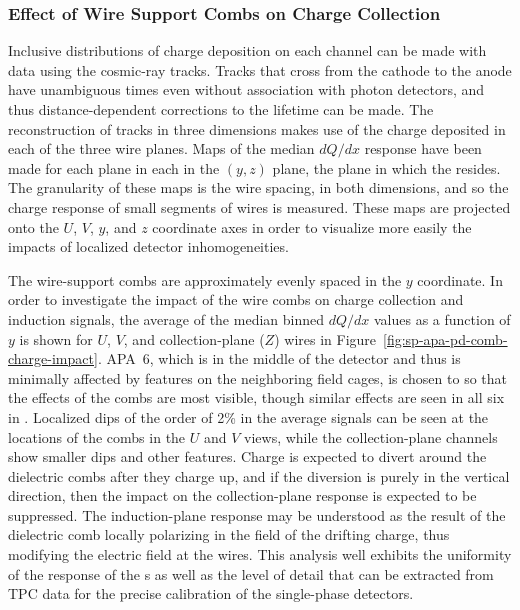 


\subsubsection{Effect of Wire Support Combs on Charge Collection}
\label{sec:fdsp-apa-qa-protodune-ops-combs-charge}

Inclusive distributions of charge deposition on each channel can be made with  data using the cosmic-ray tracks.  Tracks that cross from the cathode to the anode have unambiguous times even without association with photon detectors, and thus distance-dependent corrections to the lifetime can be made.  The reconstruction of tracks in three dimensions makes use of the charge deposited in each of the three wire planes.  Maps of the median $dQ/dx$ response have been made for each plane in each  in the $(y,z)$ plane, the plane in which the  resides.  The granularity of these maps is the wire spacing, in both dimensions, and so the charge response of small segments of wires is measured.  These maps are projected onto the $U$, $V$, $y$, and $z$ coordinate axes in order to visualize more easily the impacts of localized detector inhomogeneities.

The wire-support combs are approximately evenly spaced in the $y$ coordinate.  In order to investigate the impact of the wire combs on charge collection and induction signals, the average of the median binned $dQ/dx$ values as a function of $y$ is shown for $U$, $V$, and collection-plane ($Z$) wires in Figure~\ref{fig:sp-apa-pd-comb-charge-impact}.  APA~6, which is in the middle of the detector and thus is minimally affected by features on the neighboring field cages, is chosen to so that the effects of the combs are most visible, though similar effects are seen in all six  in .  Localized dips of the order of 2\% in the average signals can be seen at the locations of the combs in the $U$ and $V$ views, while the collection-plane channels show smaller dips and other features.  Charge is expected to divert around the dielectric combs after they charge up, and if the diversion is purely in the vertical direction, then the impact on the collection-plane response is expected to be suppressed.  The induction-plane response may be understood as the result of the dielectric comb locally polarizing in the field of the drifting charge, thus modifying the electric field at the wires.  This analysis well exhibits the uniformity of the response of the  s as well as the level of detail that can be extracted from TPC data for the precise calibration of the single-phase detectors.

